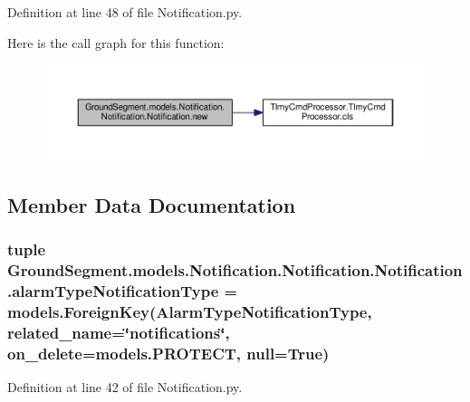 Definition at line 48 of file Notification.\+py.



Here is the call graph for this function\+:\nopagebreak
\begin{figure}[H]
\begin{center}
\leavevmode
\includegraphics[width=350pt]{class_ground_segment_1_1models_1_1_notification_1_1_notification_1_1_notification_ad9be3de0a1aef79bd4828cf5f3db8973_cgraph}
\end{center}
\end{figure}




\subsection{Member Data Documentation}
\hypertarget{class_ground_segment_1_1models_1_1_notification_1_1_notification_1_1_notification_ad668e7d1e333d3c3d4114276108046d7}{}
\subsubsection[{alarm\+Type\+Notification\+Type}]{\setlength{\rightskip}{0pt plus 5cm}tuple Ground\+Segment.\+models.\+Notification.\+Notification.\+Notification.\+alarm\+Type\+Notification\+Type = models.\+Foreign\+Key({\bf Alarm\+Type\+Notification\+Type}, related\+\_\+name=\char`\"{}notifications\char`\"{}, on\+\_\+delete=models.\+P\+R\+O\+T\+E\+C\+T, null=True)\hspace{0.3cm}{\ttfamily [static]}}\label{class_ground_segment_1_1models_1_1_notification_1_1_notification_1_1_notification_ad668e7d1e333d3c3d4114276108046d7}


Definition at line 42 of file Notification.\+py.

